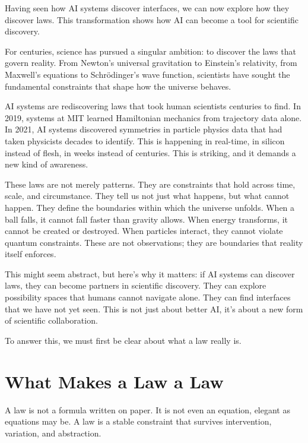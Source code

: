 \documentclass[
  openright]{book}
\begin{document}
Having seen how AI systems discover interfaces, we can now explore how
they discover laws. This transformation shows how AI can become a tool
for scientific discovery.

For centuries, science has pursued a singular ambition: to discover the
laws that govern reality. From Newton's universal gravitation to
Einstein's relativity, from Maxwell's equations to Schrödinger's
wave function, scientists have sought the
fundamental constraints that shape how the universe behaves.

AI systems are rediscovering laws that took human scientists centuries
to find. In 2019, systems at MIT learned
Hamiltonian mechanics from trajectory data
alone. In 2021, AI systems discovered symmetries in particle physics
data that had taken physicists decades to identify. This is happening in
real-time, in silicon instead of flesh, in weeks instead of centuries.
This is striking, and it demands a new kind of awareness.

These laws are not merely patterns. They are constraints that hold
across time, scale, and circumstance. They tell us not just what
happens, but what cannot happen. They define the boundaries within which
the universe unfolds. When a ball falls, it cannot fall faster than
gravity allows. When energy transforms, it cannot be created or
destroyed. When particles interact, they cannot violate quantum
constraints. These are not observations; they are boundaries that
reality itself enforces.

This might seem abstract, but here's why it matters: if AI systems can
discover laws, they can become partners in scientific discovery. They
can explore possibility spaces that humans cannot navigate alone. They
can find interfaces that we have not yet seen. This is not just about
better AI, it's about a new form of scientific collaboration.

To answer this, we must first be clear about what a law really is.

\section{What Makes a Law a Law}\label{what-makes-a-law-a-law}

A law is not a formula written on paper. It is not even an
equation, elegant as equations may be. A law is a
stable constraint that survives
intervention, variation, and abstraction.
\end{document}
